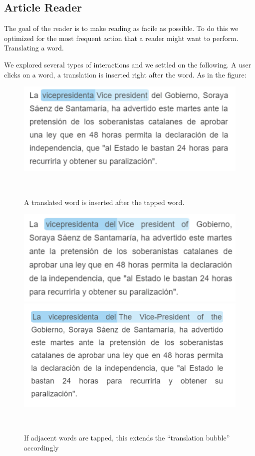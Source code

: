 \subsection{Article Reader}

The goal of the reader is to make reading as facile as possible. To do this we optimized for the most frequent action that a reader might want to perform. Translating a word. 

We explored several types of interactions and we settled on the following. 
A user clicks on a word, a translation is inserted right after the word. As in the figure: 

\begin{figure}[h!]
\centering
  \includegraphics[width=0.8\columnwidth]{figures/translated_word}
  \caption{A translated word is inserted after the tapped word.}~\label{fig:registrations}
\end{figure}

\begin{figure}[h!]
\centering
  \includegraphics[width=0.8\columnwidth]{figures/translated_words1}
  \includegraphics[width=0.8\columnwidth]{figures/translated_words2}
  \caption{If adjacent words are tapped, this extends the ``translation bubble'' accordingly}~\label{fig:registrations}
\end{figure}

